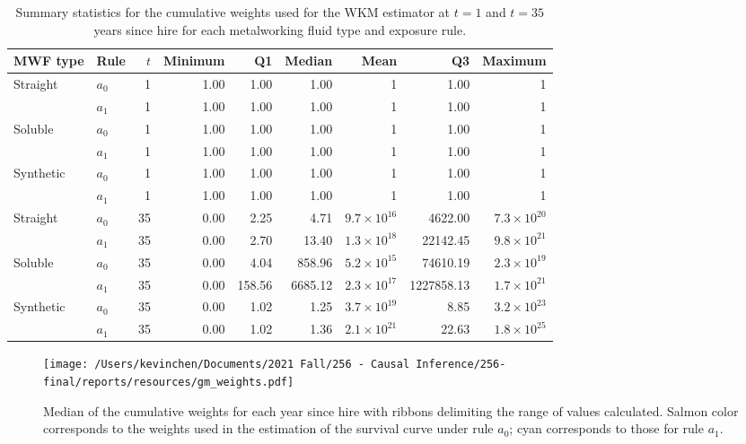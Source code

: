 \documentclass[
  11pt,
]{article}
\begin{document}
\begin{table}[H]
\centering
\caption{Summary statistics for the cumulative weights used for the WKM estimator at $t = 1$ and $t = 35$ years since hire for each metalworking fluid type and exposure rule.} 
\label{tab:gm_w}
\begin{tabular}{llrrrrrrr}
  \toprule
MWF type & Rule & $t$ & Minimum & Q1 & Median & Mean & Q3 & Maximum \\ 
  \midrule
Straight & $a_0$ &   1 & 1.00 & 1.00 & 1.00 &   1 & 1.00 &   1 \\ 
   & $a_1$ &   1 & 1.00 & 1.00 & 1.00 &   1 & 1.00 &   1 \\ 
  Soluble & $a_0$ &   1 & 1.00 & 1.00 & 1.00 &   1 & 1.00 &   1 \\ 
   & $a_1$ &   1 & 1.00 & 1.00 & 1.00 &   1 & 1.00 &   1 \\ 
  Synthetic & $a_0$ &   1 & 1.00 & 1.00 & 1.00 &   1 & 1.00 &   1 \\ 
   & $a_1$ &   1 & 1.00 & 1.00 & 1.00 &   1 & 1.00 &   1 \\ 
  Straight & $a_0$ &  35 & 0.00 & 2.25 & 4.71 & $9.7 \times 10^{16}$ & 4622.00 & $7.3 \times 10^{20}$ \\ 
   & $a_1$ &  35 & 0.00 & 2.70 & 13.40 & $1.3 \times 10^{18}$ & 22142.45 & $9.8 \times 10^{21}$ \\ 
  Soluble & $a_0$ &  35 & 0.00 & 4.04 & 858.96 & $5.2 \times 10^{15}$ & 74610.19 & $2.3 \times 10^{19}$ \\ 
   & $a_1$ &  35 & 0.00 & 158.56 & 6685.12 & $2.3 \times 10^{17}$ & 1227858.13 & $1.7 \times 10^{21}$ \\ 
  Synthetic & $a_0$ &  35 & 0.00 & 1.02 & 1.25 & $3.7 \times 10^{19}$ & 8.85 & $3.2 \times 10^{23}$ \\ 
   & $a_1$ &  35 & 0.00 & 1.02 & 1.36 & $2.1 \times 10^{21}$ & 22.63 & $1.8 \times 10^{25}$ \\ 
   \bottomrule
\end{tabular}
\end{table}

\begin{figure}
\caption{Median of the cumulative weights for each year since hire with ribbons delimiting the range of values calculated. Salmon color corresponds to the weights used in the estimation of the survival curve under rule $a_0$; cyan corresponds to those for rule $a_1$.}
\label{fig:gm_weights}
\begin{center}
\texttt{[image: /Users/kevinchen/Documents/2021 Fall/256 - Causal Inference/256-final/reports/resources/gm\_weights.pdf]}
\end{center}
\end{figure}
\end{document}
